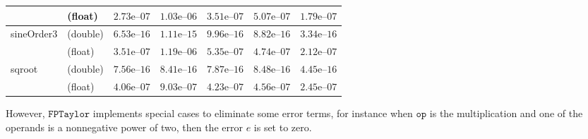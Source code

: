 \documentclass[a4paper,10pt]{article}
\newcommand{\op}{\mathtt{op}}
\newcommand{\fptaylor}{\mathtt{FPTaylor}}
\theoremstyle{plain}
\theoremstyle{definition}
\theoremstyle{remark}
\begin{document}
\begin{table}[!ht]
\begin{center}
\begin{tabular}{p{2.3cm}lccccc}
& (float) & $2.73\text{e--}07$ & $1.03\text{e--}06$ & $3.51\text{e--}07$ & $5.07\text{e--}07$ & $1.79\text{e--}07$\\
\hline
\multirow{2}{*}{sineOrder3}
& (double) & $6.53\text{e--}16$ & $1.11\text{e--}15$ & $9.96\text{e--}16$ & $8.82\text{e--}16$ & $3.34\text{e--}16$\\
& (float) & $3.51\text{e--}07$ & $1.19\text{e--}06$ & $5.35\text{e--}07$ & $4.74\text{e--}07$ & $2.12\text{e--}07$\\
\hline
\multirow{2}{*}{sqroot}
& (double) & $7.56\text{e--}16$ & $8.41\text{e--}16$ & $7.87\text{e--}16$ & $8.48\text{e--}16$ & $4.45\text{e--}16$\\
& (float) & $4.06\text{e--}07$ & $9.03\text{e--}07$ & $4.23\text{e--}07$ & $4.56\text{e--}07$ & $2.45\text{e--}07$\\
\hline
\end{tabular}
\label{table:error}
\end{center}
\end{table}


However, $\fptaylor$ implements special cases to eliminate some error terms, for instance when $\op$ is the multiplication and one of the operands is a nonnegative power of two, then the error $e$ is set to zero. 
\end{document}
